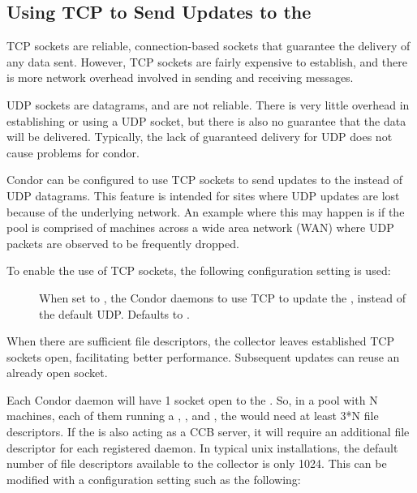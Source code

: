 \subsection{\label{sec:tcp-collector-update}Using TCP to Send Updates to
the }


TCP sockets are reliable, connection-based sockets that guarantee
the delivery of any data sent.
However, TCP sockets are fairly expensive to establish, and there is more
network overhead involved in sending and receiving messages.

UDP sockets are datagrams, and are not reliable.
There is very little overhead in establishing or using a UDP socket,
but there is also no guarantee that the data will be delivered.
Typically, the lack of guaranteed delivery for UDP does not cause
problems for condor.

Condor can be configured to use TCP
sockets to send updates to the  instead of
UDP datagrams.
This feature is intended for sites where UDP updates are
lost because of the underlying network.
An example where this may happen is if the pool is comprised of
machines across a wide area network (WAN) where UDP packets are
observed to be frequently dropped.

To enable the use of TCP sockets, the following configuration
setting is used:

\begin{description}

\item[]
  When set to , the Condor daemons to use TCP to
  update the , instead of the default UDP.
  Defaults to .

\end{description}

When there are sufficient file descriptors, the collector leaves
established TCP sockets open, facilitating better performance.
Subsequent updates can reuse an already open socket.

Each Condor daemon will have 1 socket open to the .
So, in a pool with N machines, each of them running a ,
, and , the  would
need at least 3*N file descriptors.  If the  is also
acting as a CCB server, it will require an additional file descriptor for
each registered daemon.  In typical unix installations,
the default number of file descriptors available to the collector is only
1024.  This can be modified with a configuration setting such as the following:

